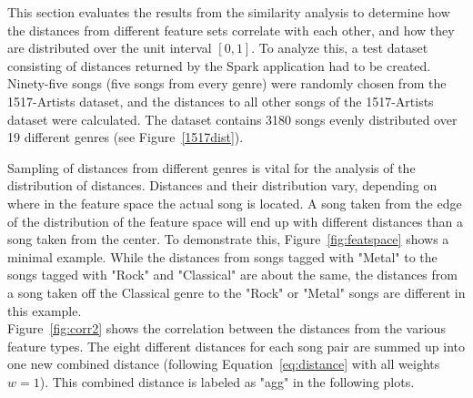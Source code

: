 This section evaluates the results from the similarity analysis to determine how the distances from different feature sets correlate with each other, and how they are distributed over the unit interval $[0,1]$.
\noindent To analyze this, a test dataset consisting of distances returned by the Spark application had to be created. Ninety-five songs (five songs from every genre) were randomly chosen from the 1517-Artists dataset, and the distances to all other songs of the 1517-Artists dataset were calculated. The dataset contains 3180 songs evenly distributed over 19 different genres (see Figure~\ref{1517dist}).
\begin{figure}[htbp]
	\centering
\end{figure}%
\FloatBarrier

\noindent Sampling of distances from different genres is vital for the analysis of the distribution of distances. Distances and their distribution vary, depending on where in the feature space the actual song is located. 
\noindent A song taken from the edge of the distribution of the feature space will end up with different distances than a song taken from the center. To demonstrate this, Figure~\ref{fig:featspace} shows a minimal example. While the distances from songs tagged with "Metal" to the songs tagged with "Rock" and "Classical" are about the same, the distances from a song taken off the Classical genre to the "Rock" or "Metal" songs are different in this example.\\ 
\noindent Figure~\ref{fig:corr2} shows the correlation between the distances from the various feature types. The eight different distances for each song pair are summed up into one new combined distance (following Equation~\eqref{eq:distance} with all weights $w = 1$). This combined distance is labeled as "agg" in the following plots.

